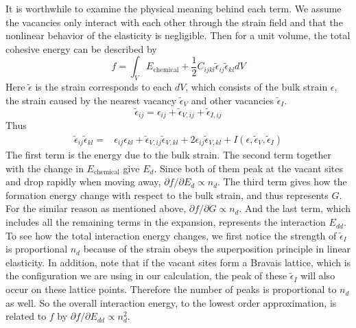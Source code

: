 \documentclass[%
 reprint,
 nofootinbib,
 amsmath,amssymb,
 aps,
]{revtex4-1}
\begin{document}
It is worthwhile to examine the physical meaning behind each term.
We assume the vacancies only interact with each other through the strain field and that the nonlinear behavior of the elasticity is negligible.
Then for a unit volume, the total cohesive energy can be described by
\begin{equation}
\label{eq:f_explain}
f =  \int_V E_{\mathrm{chemical}} + \frac{1}{2}C_{ijkl}\widetilde{\epsilon}_{ij}\widetilde{\epsilon}_{kl} dV
\end{equation}
Here $\widetilde{\epsilon}$ is the strain corresponds to each $dV$, which consists of the bulk strain $\epsilon$, the strain caused by the nearest vacancy $\widetilde{\epsilon}_V$ and other vacancies $\widetilde{\epsilon}_I$.
\begin{equation}
  \widetilde{\epsilon}_{ij} = \epsilon_{ij} + \widetilde{\epsilon}_{V,ij} + \widetilde{\epsilon}_{I,ij}
\end{equation}
Thus
\begin{align}
  \widetilde{\epsilon}_{ij}\widetilde{\epsilon}_{kl}
  = & \epsilon_{ij}\epsilon_{kl} + \widetilde{\epsilon}_{V,ij}\widetilde{\epsilon}_{V,kl}
  + 2\epsilon_{ij}\widetilde{\epsilon}_{V,kl}
  + I(\epsilon, \widetilde{\epsilon}_{V}, \widetilde{\epsilon}_{I})
\end{align}
The first term is the energy due to the bulk strain.
The second term together with the change in $E_\mathrm{chemical}$ give $E_d$.
Since both of them peak at the vacant sites and drop rapidly when moving away, $\partial f /\partial E_d \propto n_d$.
The third term gives how the formation energy change with respect to the bulk strain, and thus represents $G$.
For the similar reason as mentioned above, $\partial f/\partial G \propto n_d$.
And the last term, which includes all the remaining terms in the expansion, represents the interaction $E_{dd}$.
To see how the total interaction energy changes, we first notice the strength of $\widetilde{\epsilon}_I$ is proportional $n_d$ because of the strain obeys the superposition principle in linear elasticity.
In addition, note that if the vacant sites form a Bravais lattice, which is the configuration we are using in our calculation, the peak of these $\widetilde{\epsilon}_I$ will also occur on these lattice points.
Therefore the number of peaks is proportional to $n_d$ as well.
So the overall interaction energy, to the lowest order approximation, is related to $f$ by $\partial f/\partial E_{dd} \propto n_d^2$.
\end{document}
